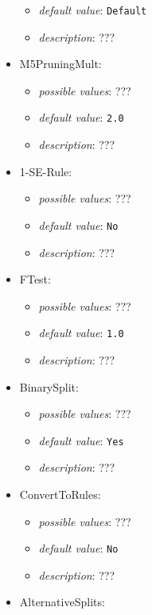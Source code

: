 \documentclass{article}
\begin{document}
\begin{itemize}
\begin{itemize}
                \item \emph{default value}: \texttt{Default}
                \item \emph{description}: ???
           \end{itemize}
    \item M5PruningMult:
           \begin{itemize}
                \item \emph{possible values}: ???
                \item \emph{default value}: \texttt{2.0}
                \item \emph{description}: ???
           \end{itemize}
    \item 1-SE-Rule:
           \begin{itemize}
                \item \emph{possible values}: ???
                \item \emph{default value}: \texttt{No}
                \item \emph{description}: ???
           \end{itemize}
    \item FTest:
           \begin{itemize}
                \item \emph{possible values}: ???
                \item \emph{default value}: \texttt{1.0}
                \item \emph{description}: ???
           \end{itemize}
    \item BinarySplit:
           \begin{itemize}
                \item \emph{possible values}: ???
                \item \emph{default value}: \texttt{Yes}
                \item \emph{description}: ???
           \end{itemize}
    \item ConvertToRules:
           \begin{itemize}
                \item \emph{possible values}: ???
                \item \emph{default value}: \texttt{No}
                \item \emph{description}: ???
           \end{itemize}
    \item AlternativeSplits:

\end{itemize}
\end{document}
